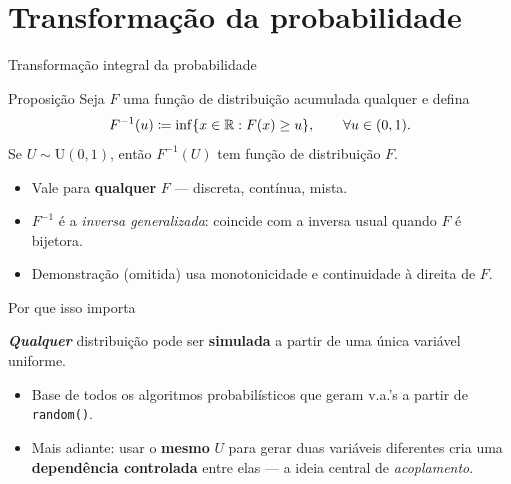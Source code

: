 \documentclass[aspectratio=169]{beamer}
\begin{document}
\section{Transformação  da probabilidade}

\begin{frame}{Transformação integral da probabilidade} 
  \begin{block}{Proposição}
    Seja $F$ uma função de distribuição acumulada qualquer e defina
    \[
      F^{-1}(u)\coloneqq \inf\{x\in\mathbb{R} : F(x)\geq u\}, \qquad \forall u\in(0,1).
    \]
    Se $U\sim \mathrm{U}(0,1)$, então $F^{-1}(U)$ tem função de
    distribuição $F$.
  \end{block}

  \vfill
  
  \begin{itemize}
    \item Vale para \textbf{qualquer} $F$ --- discreta, contínua, mista.
    \item $F^{-1}$ é a \emph{inversa generalizada}: coincide com a
          inversa usual quando $F$ é bijetora.
        \item Demonstração (omitida) usa monotonicidade e continuidade à
          direita de $F$.
  \end{itemize}
\end{frame}
\begin{frame}{Por que isso importa}
  \begin{center}
    \Large
    {\textbf\textit{{Qualquer}}} distribuição pode ser \textbf{simulada} a partir de uma
    única variável uniforme.
  \end{center}
  \vfill
  \begin{itemize}
    \item Base de todos os algoritmos probabilísticos que geram v.a.'s
          a partir de \texttt{random()}.
    \item Mais adiante: usar o \textbf{mesmo} $U$ para gerar duas
          variáveis diferentes cria uma \textbf{dependência
          controlada} entre elas --- a ideia central de
          \emph{acoplamento}.
  \end{itemize}
\end{frame}
\end{document}
